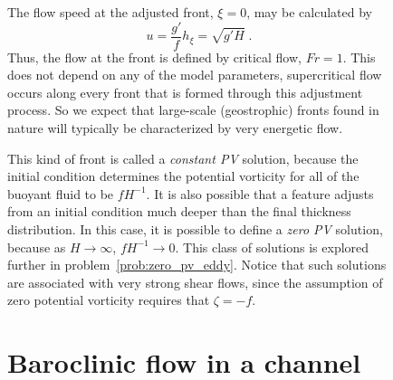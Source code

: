 \documentclass[11pt]{report}
\numberwithin{equation}{section}
\begin{document}
\begin{figure}
The flow speed at the adjusted front, $\xi = 0$, may be calculated by
\begin{equation}
    u = \frac{g'}{f} h_\xi = \sqrt{g' H} \; .
\end{equation}
Thus, the flow at the front is defined by critical flow, $Fr = 1$.  This does not depend on any of the model parameters, supercritical flow occurs along every front that is formed through this adjustment process.  So we expect that large-scale (geostrophic) fronts found in nature will typically be characterized by very energetic flow.

This kind of front is called a \emph{constant PV} solution, because the initial condition determines the potential vorticity for all of the buoyant fluid to be $f H^{-1}$.  It is also possible that a feature adjusts from an initial condition much deeper than the final thickness distribution.  In this case, it is possible to define a \emph{zero PV} solution, because as $H \rightarrow \infty$, $f H^{-1} \rightarrow 0$.  This class of solutions is explored further in problem~\ref{prob:zero_pv_eddy}.  Notice that such solutions are associated with very strong shear flows, since the assumption of zero potential vorticity requires that $\zeta = -f$.



\section{Baroclinic flow in a channel}


\end{figure}
\end{document}
